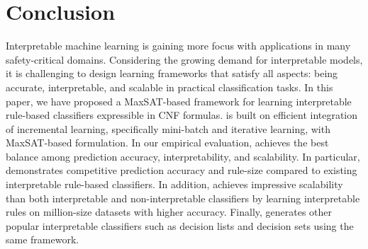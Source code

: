 
\section{Conclusion}
\label{interpretability_imli_sec:conclusion}
Interpretable machine learning is gaining more focus with applications in many safety-critical domains. Considering the growing demand for interpretable models, it is challenging to design learning frameworks that satisfy all aspects: being accurate, interpretable, and scalable in practical classification tasks.  In this paper, we have proposed a MaxSAT-based framework {\imli} for learning interpretable rule-based classifiers expressible in CNF formulas. {\imli} is built on efficient integration of incremental learning, specifically mini-batch and iterative learning, with MaxSAT-based formulation.  In our empirical evaluation, {\imli} achieves the best balance among prediction accuracy, interpretability, and scalability. In particular, {\imli} demonstrates competitive prediction accuracy and rule-size compared to existing interpretable rule-based classifiers. In addition, {\imli} achieves impressive scalability than both interpretable and non-interpretable classifiers by learning interpretable rules on million-size datasets with higher accuracy.  Finally, {\imli}  generates other popular interpretable classifiers such as decision lists and decision sets using the same framework.



